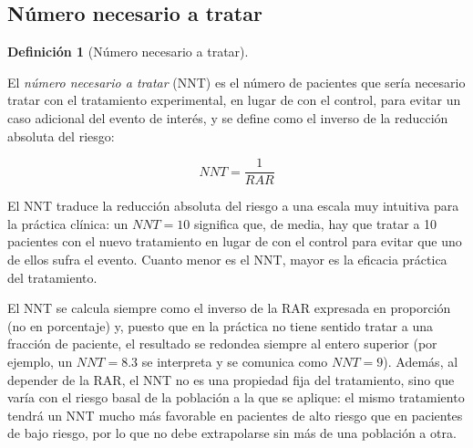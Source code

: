 \documentclass[
  spanish,
  a4paper,
]{scrreport}
\theoremstyle{definition}
\theoremstyle{definition}
\newtheorem{definition}{Definición}[chapter]
\theoremstyle{remark}
\begin{document}
\subsection{Número necesario a
tratar}\label{nuxfamero-necesario-a-tratar}

\begin{definition}[Número necesario a
tratar]\protect\hypertarget{def-experimentales-nnt}{}\label{def-experimentales-nnt}

El \emph{número necesario a tratar} (NNT) es el número de pacientes que
sería necesario tratar con el tratamiento experimental, en lugar de con
el control, para evitar un caso adicional del evento de interés, y se
define como el inverso de la reducción absoluta del riesgo:

\[NNT = \frac{1}{RAR}\]

\end{definition}

\begin{tcolorbox}[enhanced jigsaw, arc=.35mm, bottomrule=.15mm, bottomtitle=1mm, breakable, colback=white, colbacktitle=quarto-callout-note-color!10!white, colframe=quarto-callout-note-color-frame, coltitle=black, left=2mm, leftrule=.75mm, opacityback=0, opacitybacktitle=0.6, rightrule=.15mm, title=\textcolor{quarto-callout-note-color}{\faInfo}\hspace{0.5em}{Interpretación}, titlerule=0mm, toprule=.15mm, toptitle=1mm]

El NNT traduce la reducción absoluta del riesgo a una escala muy
intuitiva para la práctica clínica: un \(NNT=10\) significa que, de
media, hay que tratar a 10 pacientes con el nuevo tratamiento en lugar
de con el control para evitar que uno de ellos sufra el evento. Cuanto
menor es el NNT, mayor es la eficacia práctica del tratamiento.

\end{tcolorbox}

\begin{tcolorbox}[enhanced jigsaw, arc=.35mm, bottomrule=.15mm, bottomtitle=1mm, breakable, colback=white, colbacktitle=quarto-callout-warning-color!10!white, colframe=quarto-callout-warning-color-frame, coltitle=black, left=2mm, leftrule=.75mm, opacityback=0, opacitybacktitle=0.6, rightrule=.15mm, title=\textcolor{quarto-callout-warning-color}{\faExclamationTriangle}\hspace{0.5em}{Advertencia}, titlerule=0mm, toprule=.15mm, toptitle=1mm]

El NNT se calcula siempre como el inverso de la RAR expresada en
proporción (no en porcentaje) y, puesto que en la práctica no tiene
sentido tratar a una fracción de paciente, el resultado se redondea
siempre al entero superior (por ejemplo, un \(NNT=8.3\) se interpreta y
se comunica como \(NNT=9\)). Además, al depender de la RAR, el NNT no es
una propiedad fija del tratamiento, sino que varía con el riesgo basal
de la población a la que se aplique: el mismo tratamiento tendrá un NNT
mucho más favorable en pacientes de alto riesgo que en pacientes de bajo
riesgo, por lo que no debe extrapolarse sin más de una población a otra.

\end{tcolorbox}
\end{document}
